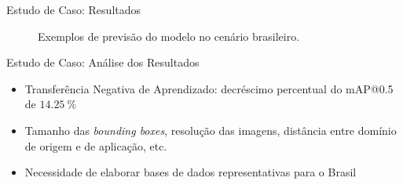 \begin{frame}{Estudo de Caso: Resultados}
\begin{figure}[h!]
	\centering
	\hfill{}\hfill
	\hfill
	\caption{Exemplos de previsão do modelo no cenário brasileiro.}
	
\end{figure}
\end{frame}

\begin{frame}{Estudo de Caso: Análise dos Resultados}
\begin{itemize}
    \item Transferência Negativa de Aprendizado: decréscimo percentual do mAP@0.5 de $\SI{14,25}{\percent}$
    \ \ \newline
    \item Tamanho das \emph{bounding boxes}, resolução das imagens, distância entre domínio de origem e de aplicação, etc.
    \ \ \newline
    \item Necessidade de elaborar bases de dados representativas para o Brasil
\end{itemize}

\end{frame}
